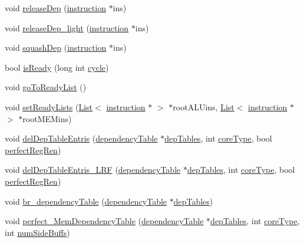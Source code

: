 \begin{DoxyCompactItemize}
\item 
void \hyperlink{classinstruction_a9c036772123e1dcf59239cd5fd065f0f}{releaseDep} (\hyperlink{classinstruction}{instruction} $\ast$ins)
\item 
void \hyperlink{classinstruction_a2efa8c5533c25ab4cf5fc812b65a0dc7}{releaseDep\_\-light} (\hyperlink{classinstruction}{instruction} $\ast$ins)
\item 
void \hyperlink{classinstruction_a9643852ed74b72636a5327a6278fe12f}{squashDep} (\hyperlink{classinstruction}{instruction} $\ast$ins)
\item 
bool \hyperlink{classinstruction_a3d3c5926b3f74fa012e77011f6d65a57}{isReady} (long int \hyperlink{vliwScheduler_8cpp_a1f4871d45089b039d95d3832dd123827}{cycle})
\item 
void \hyperlink{classinstruction_ae98b3fc0943715a103b91ab8bf272758}{goToReadyList} ()
\item 
void \hyperlink{classinstruction_a21509e081fdfd3665c30d1bab3e1fd45}{setReadyLists} (\hyperlink{classList}{List}$<$ \hyperlink{classinstruction}{instruction} $\ast$ $>$ $\ast$rootALUins, \hyperlink{classList}{List}$<$ \hyperlink{classinstruction}{instruction} $\ast$ $>$ $\ast$rootMEMins)
\item 
void \hyperlink{classinstruction_aa97fc6d29e3d841baede2a83414b3997}{delDepTableEntris} (\hyperlink{classdependencyTable}{dependencyTable} $\ast$\hyperlink{vliwScheduler_8cpp_ab1dae06b10269a1b683512c8ecb25def}{depTables}, int \hyperlink{vliwScheduler_8cpp_a617ce1763c0446f48a6d3a158d507f46}{coreType}, bool \hyperlink{bkEnd_8cpp_a24de26574dd41fb459f4e9c7eef97d2d}{perfectRegRen})
\item 
void \hyperlink{classinstruction_ae2485787a9240cab1aa5d9f87df01a04}{delDepTableEntris\_\-LRF} (\hyperlink{classdependencyTable}{dependencyTable} $\ast$\hyperlink{vliwScheduler_8cpp_ab1dae06b10269a1b683512c8ecb25def}{depTables}, int \hyperlink{vliwScheduler_8cpp_a617ce1763c0446f48a6d3a158d507f46}{coreType}, bool \hyperlink{bkEnd_8cpp_a24de26574dd41fb459f4e9c7eef97d2d}{perfectRegRen})
\item 
void \hyperlink{classinstruction_a578f14a412f7d77a1e87aa52af78eade}{br\_\-dependencyTable} (\hyperlink{classdependencyTable}{dependencyTable} $\ast$\hyperlink{vliwScheduler_8cpp_ab1dae06b10269a1b683512c8ecb25def}{depTables})
\item 
void \hyperlink{classinstruction_a213dc8dc75e0df8b8be759462b3cb8b9}{perfect\_\-MemDependencyTable} (\hyperlink{classdependencyTable}{dependencyTable} $\ast$\hyperlink{vliwScheduler_8cpp_ab1dae06b10269a1b683512c8ecb25def}{depTables}, int \hyperlink{vliwScheduler_8cpp_a617ce1763c0446f48a6d3a158d507f46}{coreType}, int \hyperlink{backend_2parser_8cpp_a33b052a847ffe72153acdfeaa15c48da}{numSideBuffs})

\end{DoxyCompactItemize}

